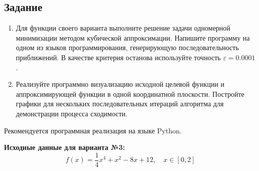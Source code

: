 \subsection{Задание}

\begin{enumerate}
  \item Для функции своего варианта выполните решение задачи одномерной минимизации методом кубической аппроксимации. Напишите программу на одном из языков программирования, генерирующую последовательность приближений. В качестве критерия останова используйте точность $\varepsilon = 0.0001$.
  \item Реализуйте программно визуализацию исходной целевой функции и аппроксимирующей функции в одной координатной плоскости. Постройте графики для нескольких последовательных итераций алгоритма для демонстрации процесса сходимости.
\end{enumerate}

Рекомендуется программная реализация на языке Python.

\textbf{Исходные данные для варианта №3:}
\[
  f(x) = \frac{1}{4}x^4 + x^2 - 8x + 12, \quad x \in [0, 2]
\]